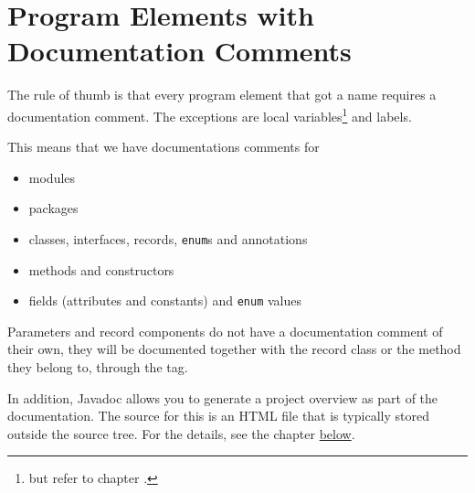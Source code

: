 \section{Program Elements with Documentation Comments} 
The rule of thumb is that every program element that got a name requires a documentation comment. The exceptions are local variables\footnote{but refer to chapter .} and labels.

This means that we have documentations comments for
\begin{itemize}[nosep]
	\item{modules}
	\item{packages}
	\item{classes, interfaces, records, \lstinline|enum|s and annotations}
	\item{methods and constructors}
	\item{fields (attributes and constants) and \lstinline|enum| values}
\end{itemize}

Parameters and record components do not have a documentation comment of their own, they will be documented together with the record class or the method they belong to, through the  tag.

In addition, Javadoc allows you to generate a project overview as part of the documentation. The source for this is an HTML file that is typically stored outside the source tree. For the details, see the chapter \hyperref[sec:OverviewDoc]{below}.












